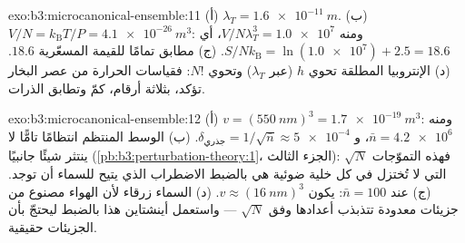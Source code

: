 \begin{solution}{exo:b3:microcanonical-ensemble:11}
(أ) $\lambda_T = \qty{1.6e-11}{m}$. (ب) $V/N = k_{\text{B}}T/P =
\qty{4.1e-26}{m^3}$: ومنه $V/N\lambda_T^3 = \num{1.0e7}$، أي
$S/Nk_{\text{B}} = \ln(\num{1.0e7}) + 2.5 = 18.6$. (ج) مطابق تمامًا
للقيمة المسعّرية $18.6$. (د) الإنتروبيا المطلقة تحوي $h$
(عبر $\lambda_T$) وتحوي $N!$: فقياسات الحرارة من
عصر البخار تؤكد، بثلاثة أرقام، كمّ 
وتطابق الذرات.
\end{solution}

\begin{solution}{exo:b3:microcanonical-ensemble:12}
(أ) $v = (\qty{550}{nm})^3 = \qty{1.7e-19}{m^3}$: ومنه $\bar n =
\num{4.2e6}$، و $\delta_{\text{جذري}} = 1/\sqrt{\bar n} \approx
\num{5e-4}$. (ب) الوسط المنتظم انتظامًا تامًّا لا ينتثر شيئًا
جانبيًا (\cref{pb:b3:perturbation-theory:1}، الجزء الثالث): فهذه
التموّجات $\sqrt N$ التي لا تُختزل في كل خلية ضوئية هي بالضبط
الاضطراب الذي يتيح للسماء أن توجد. (ج) عند $\bar n = 100$: يكون $v
\approx (\qty{16}{nm})^3$. (د) السماء زرقاء لأن الهواء مصنوع
من جزيئات معدودة تتذبذب أعدادها وفق $\sqrt N$ ---
واستعمل أينشتاين هذا بالضبط ليحتجّ بأن الجزيئات حقيقية.
\end{solution}

